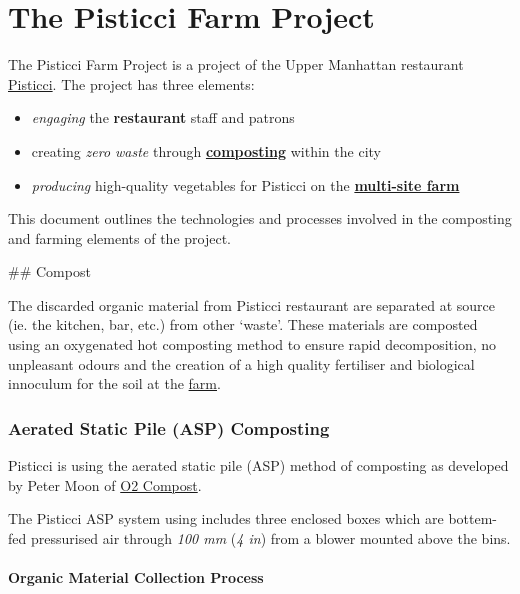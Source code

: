 \section{The Pisticci Farm Project}\label{the-pisticci-farm-project}

The Pisticci Farm Project is a project of the Upper Manhattan restaurant
\href{http://www.pisticcinyc.com/}{Pisticci}. The project has three
elements:

\begin{itemize}
\tightlist
\item
  \emph{engaging} the \textbf{restaurant} staff and patrons
\item
  creating \emph{zero waste} through
  \protect\hyperlink{compost}{\textbf{composting}} within the city
\item
  \emph{producing} high-quality vegetables for Pisticci on the
  \protect\hyperlink{farm}{\textbf{multi-site farm}}
\end{itemize}

This document outlines the technologies and processes involved in the
composting and farming elements of the project.

 \#\# Compost

The discarded organic material from Pisticci restaurant are separated at
source (ie. the kitchen, bar, etc.) from other `waste'. These materials
are composted using an oxygenated hot composting method to ensure rapid
decomposition, no unpleasant odours and the creation of a high quality
fertiliser and biological innoculum for the soil at the
\protect\hyperlink{farm}{farm}.

\subsubsection{Aerated Static Pile (ASP)
Composting}\label{aerated-static-pile-asp-composting}

Pisticci is using the aerated static pile (ASP) method of composting as
developed by Peter Moon of \href{http://www.o2compost.com}{O2 Compost}.

The Pisticci ASP system using includes three enclosed boxes which are
bottem-fed pressurised air through \emph{100 mm} (\emph{4 in}) from a
blower mounted above the bins.

\paragraph{Organic Material Collection
Process}\label{organic-material-collection-process}

